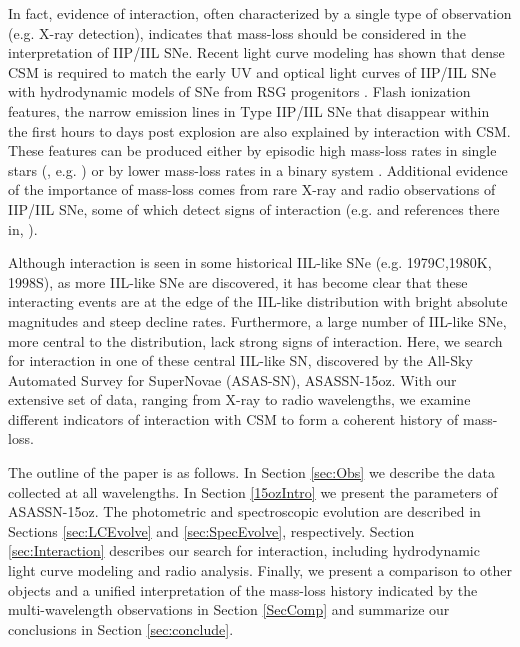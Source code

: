 \documentclass[a4paper,fleqn,usenatbib]{mnras}
\begin{document}
In fact, evidence of interaction, often characterized by a single type of observation (e.g. X-ray detection), indicates that mass-loss should be considered in the interpretation of IIP/IIL SNe.
Recent light curve modeling has shown that dense CSM is required to match the early UV and optical light curves of IIP/IIL SNe with hydrodynamic models of SNe from RSG progenitors \citep{2015gezari,2018morozova,2018paxton,2018foerster}.  
Flash ionization features, the narrow emission lines in Type IIP/IIL SNe that disappear within the first hours to days post explosion are also explained by interaction with CSM. 
These features can be produced either by episodic high mass-loss rates in single stars (\citealt{2014gal-yam}, e.g. \citealt{ 2017yaron}) or by lower mass-loss rates in a binary system \citep{2018kochanek}.
Additional evidence of the importance of mass-loss comes from rare X-ray and radio observations of IIP/IIL SNe, some of which detect signs of interaction (e.g. \citealt{2014dwarkadas} and references there in, \citealt{2018morozova2}).

Although interaction is seen in some historical IIL-like SNe (e.g. 1979C,1980K, 1998S), as more IIL-like SNe are discovered, it has become clear that these interacting events are at the edge of the IIL-like distribution with bright absolute magnitudes and steep decline rates. 
Furthermore, a large number of IIL-like SNe, more central to the distribution, lack strong signs of interaction.
Here, we search for interaction in one of these central IIL-like SN, discovered by the All-Sky Automated Survey for SuperNovae (ASAS-SN), ASASSN-15oz.
With our extensive set of data, ranging from X-ray to radio wavelengths, we examine different indicators of interaction with CSM to form a coherent history of mass-loss.

The outline of the paper is as follows.
In Section \ref{sec:Obs} we describe the data collected at all wavelengths.
In Section \ref{15ozIntro} we present the parameters of ASASSN-15oz.
The photometric and spectroscopic evolution are described in Sections \ref{sec:LCEvolve} and \ref{sec:SpecEvolve}, respectively.
Section \ref{sec:Interaction} describes our search for interaction, including hydrodynamic light curve modeling and radio analysis.
Finally, we present a comparison to other objects and a unified interpretation of the mass-loss history indicated by the multi-wavelength observations  in Section \ref{SecComp} and summarize our conclusions in Section \ref{sec:conclude}.
\end{document}
